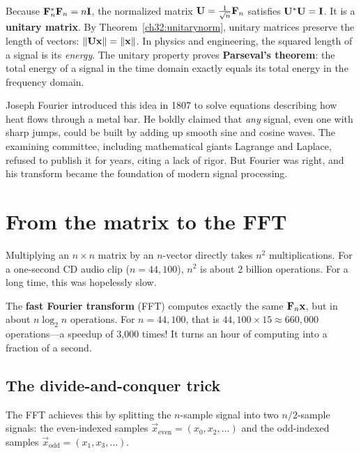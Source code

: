 Because $\mathbf{F}_n^* \mathbf{F}_n = n \mathbf{I}$, the normalized matrix $\mathbf{U} = \frac{1}{\sqrt{n}} \mathbf{F}_n$ satisfies $\mathbf{U}^* \mathbf{U} = \mathbf{I}$. It is a \textbf{unitary matrix}. By Theorem~\ref{ch32:unitarynorm}, unitary matrices preserve the length of vectors: $\lVert\mathbf{U} \mathbf{x}\rVert = \lVert\mathbf{x}\rVert$. In physics and engineering, the squared length of a signal is its \emph{energy}. The unitary property proves \textbf{Parseval's theorem}: the total energy of a signal in the time domain exactly equals its total energy in the frequency domain.

\begin{historybox}
Joseph Fourier introduced this idea in 1807 to solve equations describing how heat flows through a metal bar. He boldly claimed that \emph{any} signal, even one with sharp jumps, could be built by adding up smooth sine and cosine waves. The examining committee, including mathematical giants Lagrange and Laplace, refused to publish it for years, citing a lack of rigor. But Fourier was right, and his transform became the foundation of modern signal processing.
\end{historybox}

\section{From the matrix to the FFT}

Multiplying an $n \times n$ matrix by an $n$-vector directly takes $n^2$ multiplications. For a one-second CD audio clip ($n = 44,100$), $n^2$ is about 2 billion operations. For a long time, this was hopelessly slow.

The \textbf{fast Fourier transform} (FFT) computes exactly the same $\mathbf{F}_n \mathbf{x}$, but in about $n \log_2 n$ operations. For $n = 44,100$, that is $44,100 \times 15 \approx 660,000$ operations---a speedup of 3,000 times! It turns an hour of computing into a fraction of a second.

\subsection{The divide-and-conquer trick}

The FFT achieves this by splitting the $n$-sample signal into two $n/2$-sample signals: the even-indexed samples $\vec x_{\text{even}} = (x_0, x_2, \dots)$ and the odd-indexed samples $\vec x_{\text{odd}} = (x_1, x_3, \dots)$.

